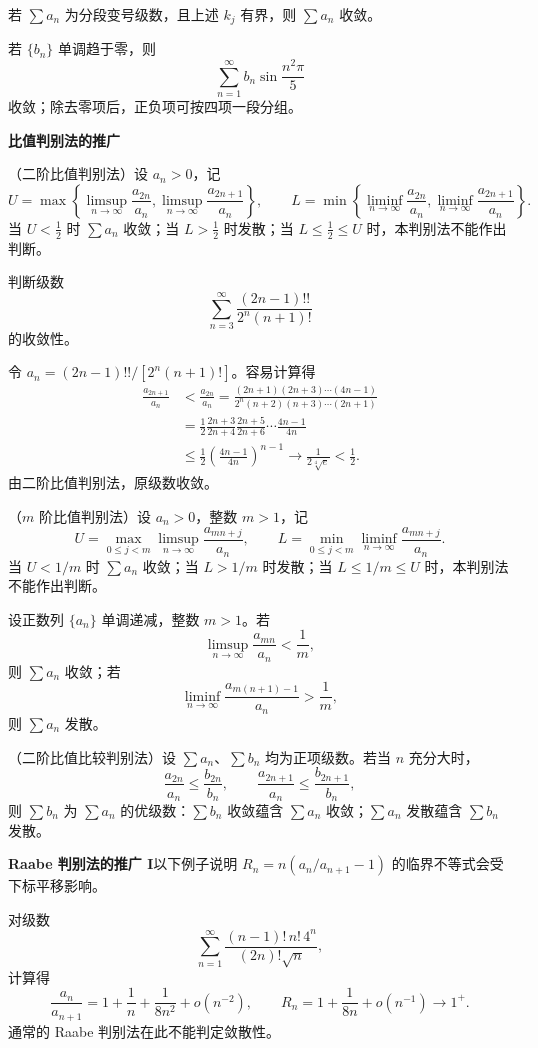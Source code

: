 若 $\sum a_n$ 为分段变号级数，且上述 $k_j$ 有界，则 $\sum a_n$ 收敛。

若 $\{b_n\}$ 单调趋于零，则
\[
\sum_{n=1}^{\infty}b_n\sin\frac{n^2\pi}{5}
\]
收敛；除去零项后，正负项可按四项一段分组。

\noindent\textbf{比值判别法的推广}

（二阶比值判别法）设 $a_n>0$，记
\[
U=\max\left\{\limsup_{n\to\infty}\frac{a_{2n}}{a_n},
\limsup_{n\to\infty}\frac{a_{2n+1}}{a_n}\right\},\qquad
L=\min\left\{\liminf_{n\to\infty}\frac{a_{2n}}{a_n},
\liminf_{n\to\infty}\frac{a_{2n+1}}{a_n}\right\}.
\]
当 $U<\tfrac12$ 时 $\sum a_n$ 收敛；当 $L>\tfrac12$ 时发散；当 $L\leq\tfrac12\leq U$ 时，本判别法不能作出判断。

判断级数
\[
\sum_{n=3}^{\infty}\frac{(2n-1)!!}{2^n(n+1)!}
\]
的收敛性。

\sol 令 $a_n=(2n-1)!!/[2^n(n+1)!]$。容易计算得
\begin{align*}
\frac{a_{2n+1}}{a_n}
&<\frac{a_{2n}}{a_n}
=\frac{(2n+1)(2n+3)\cdots(4n-1)}{2^n(n+2)(n+3)\cdots(2n+1)}\\
&=\frac12\frac{2n+3}{2n+4}\frac{2n+5}{2n+6}\cdots\frac{4n-1}{4n}\\
&\leq\frac12\left(\frac{4n-1}{4n}\right)^{n-1}
\longrightarrow\frac1{2\sqrt[4]{e}}<\frac12.
\end{align*}
由二阶比值判别法，原级数收敛。

（$m$ 阶比值判别法）设 $a_n>0$，整数 $m>1$，记
\[
U=\max_{0\leq j<m}\limsup_{n\to\infty}\frac{a_{mn+j}}{a_n},
\qquad
L=\min_{0\leq j<m}\liminf_{n\to\infty}\frac{a_{mn+j}}{a_n}.
\]
当 $U<1/m$ 时 $\sum a_n$ 收敛；当 $L>1/m$ 时发散；当 $L\leq1/m\leq U$ 时，本判别法不能作出判断。

设正数列 $\{a_n\}$ 单调递减，整数 $m>1$。若
\[
\limsup_{n\to\infty}\frac{a_{mn}}{a_n}<\frac1m,
\]
则 $\sum a_n$ 收敛；若
\[
\liminf_{n\to\infty}\frac{a_{m(n+1)-1}}{a_n}>\frac1m,
\]
则 $\sum a_n$ 发散。

（二阶比值比较判别法）设 $\sum a_n$、$\sum b_n$ 均为正项级数。若当 $n$ 充分大时，
\[
\frac{a_{2n}}{a_n}\leq\frac{b_{2n}}{b_n},
\qquad
\frac{a_{2n+1}}{a_n}\leq\frac{b_{2n+1}}{b_n},
\]
则 $\sum b_n$ 为 $\sum a_n$ 的优级数：$\sum b_n$ 收敛蕴含 $\sum a_n$ 收敛；$\sum a_n$ 发散蕴含 $\sum b_n$ 发散。

\noindent\textbf{Raabe 判别法的推广 I}\quad 以下例子说明 $R_n=n(a_n/a_{n+1}-1)$ 的临界不等式会受下标平移影响。

对级数
\[
\sum_{n=1}^{\infty}\frac{(n-1)!\,n!\,4^n}{(2n)!\sqrt n},
\]
计算得
\[
\frac{a_n}{a_{n+1}}=1+\frac1n+\frac1{8n^2}+o(n^{-2}),
\qquad
R_n=1+\frac1{8n}+o(n^{-1})\longrightarrow1^+.
\]
通常的 Raabe 判别法在此不能判定敛散性。

